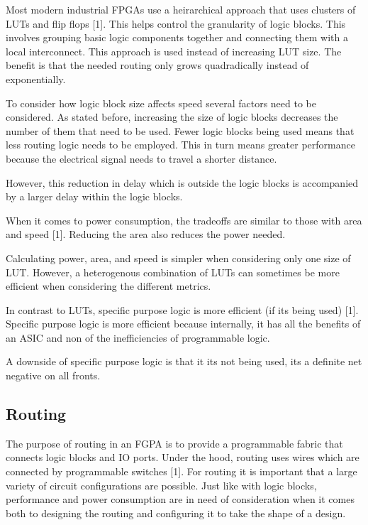 \documentclass{article}
\begin{document}
    Most modern industrial FPGAs use a heirarchical approach that uses
    clusters of LUTs and flip flops [1]. This helps control the granularity
    of logic blocks.
    This involves grouping basic logic components together and connecting
    them with a local interconnect.
    This approach is used instead of increasing LUT size.
    The benefit is that the needed routing only grows quadradically instead
    of exponentially.

    To consider how logic block size affects speed several factors need to be considered.
    As stated before, increasing the size of logic blocks decreases the number of them
    that need to be used. Fewer logic blocks being used means that less routing
    logic needs to be employed. This in turn means greater performance
    because the electrical signal needs to travel a shorter distance.

    However, this reduction in delay which is outside the logic blocks is
    accompanied by a larger delay within the logic blocks.

    When it comes to power consumption, the tradeoffs are similar to those
    with area and speed [1]. Reducing the area also reduces the power needed.

    Calculating power, area, and speed is simpler when considering only
    one size of LUT. However, a heterogenous combination of LUTs can sometimes
    be more efficient when considering the different metrics.

    In contrast to LUTs, specific purpose logic is more efficient (if its being used) [1].
    Specific purpose logic is more efficient because internally, it
    has all the benefits of an ASIC and non of the inefficiencies of programmable logic.

    A downside of specific purpose logic is that it its not being used, its
    a definite net negative on all fronts.
    
    \subsection{Routing}

    The purpose of routing in an FGPA is to provide a programmable fabric that connects
    logic blocks and IO ports. Under the hood, routing uses wires which are connected
    by programmable switches [1]. For routing it is important that a large variety
    of circuit configurations are possible. Just like with logic blocks, performance
    and power consumption are in need of consideration when it comes both to designing
    the routing and configuring it to take the shape of a design.
\end{document}
